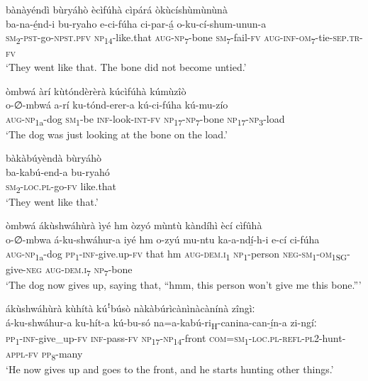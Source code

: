 bànàyéndì bùryáhò ècìfúhà cìpárá òkùcíshùmùnùnà\\
\gll ba-na-é̲nd-i      bu-ryaho e-ci-fúha    ci-par-á̲  o-ku-cí-shum-unun-a \\
\textsc{sm}\textsubscript{2}{}-\textsc{pst}{}-go-\textsc{npst}.\textsc{pfv}  \textsc{np}\textsubscript{14}{}-like.that
\textsc{aug}{}-\textsc{np}\textsubscript{7}{}-bone  \textsc{sm}\textsubscript{7}{}-fail-\textsc{fv}  \textsc{aug}{}-\textsc{inf}{}-\textsc{om}\textsubscript{7}{}-tie-\textsc{sep}.\textsc{tr}{}-\textsc{fv}\\
\glt ‘They went like that. The bone did not become untied.’\bigskip

òmbwá àrí kùtóndèrèrà kúcìfúhà kúmùzîò\\
\gll o-∅-mbwá    a-rí  ku-tónd-erer-a  kú-ci-fúha    kú-mu-zío\\
\textsc{aug}{}-\textsc{np}\textsubscript{1a}{}-dog  \textsc{sm}\textsubscript{1}{}-be  \textsc{inf}{}-look-\textsc{int}{}-\textsc{fv}  \textsc{np}\textsubscript{17}{}-\textsc{np}\textsubscript{7}{}-bone  \textsc{np}\textsubscript{17}{}-\textsc{np}\textsubscript{3}{}-load\\
\glt ‘The dog was just looking at the bone on the load.’\bigskip

bàkàbúyèndà bùryáhò\\
\gll ba-kabú-end-a  bu-ryahó\\
\textsc{sm}\textsubscript{2}{}-\textsc{loc}.\textsc{pl}{}-go-\textsc{fv}  like.that\\
\glt ‘They went like that.’\bigskip

òmbwá ákùshwáhùrà ìyé hm òzyó mùntù kàndíhì ècí cìfûhà\\
\gll o-∅-mbwa    á-ku-shwáhur-a  iyé  hm o-zyú    mu-ntu  ka-a-ndí̲-h-i      e-cí    ci-fúha\\
\textsc{aug}{}-\textsc{np}\textsubscript{1a}{}-dog  \textsc{pp}\textsubscript{1}{}-\textsc{inf}{}-give.up-\textsc{fv}  that  hm
\textsc{aug}{}-\textsc{dem}.\textsc{i}\textsubscript{1}  \textsc{np}\textsubscript{1}{}-person  \textsc{neg}{}-\textsc{sm}\textsubscript{1}{}-\textsc{om}\textsubscript{1SG}{}-give-\textsc{neg}  \textsc{aug}{}-\textsc{dem}.\textsc{i}\textsubscript{7}  \textsc{np}\textsubscript{7}{}-bone\\
\glt ‘The dog now gives up, saying that, “hmm, this person won’t give me this bone.”’\bigskip

ákùshwáhùrà kùhítà kúꜝbúsò nàkàbúrìcànìnàcànínà zîngìː\\
\gll á-ku-shwáhur-a  ku-hít-a  kú-bu-só na=a-kabú-ri\textsubscript{H}{}-canina-can-í̲n-a      zi-ngíː \\
\textsc{pp}\textsubscript{1}{}-\textsc{inf}{}-give\_up-\textsc{fv}  \textsc{inf}{}-pass-\textsc{fv}  \textsc{np}\textsubscript{17}{}-\textsc{np}\textsubscript{14}{}-front
\textsc{com}=\textsc{sm}\textsubscript{1}{}-\textsc{loc}.\textsc{pl}{}-\textsc{refl}{}-\textsc{pl}2-hunt-\textsc{appl}{}-\textsc{fv}  \textsc{pp}\textsubscript{8}{}-many\\
\glt ‘He now gives up and goes to the front, and he starts hunting other things.’\bigskip

